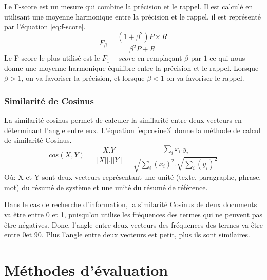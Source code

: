 \documentclass[a4paper,12pt,oneside]{../use/ESIthesis}
\begin{document}
Le F-score est un mesure qui combine la précision et le rappel. 
Il est calculé en utilisant une moyenne harmonique entre la précision et le rappel, il est représenté par l'équation \ref{eq:f-score}.
\begin{equation}
\label{eq:f-score}
F_{\beta} = \frac
{(1+\beta^2) P \times R}
{ \beta^2 P + R}
\end{equation}
Le F-score le plus utilisé est le $F_1-score$ en remplaçant $\beta$ par $1$ ce qui nous donne une moyenne harmonique équilibre entre la précision et le rappel.
Lorsque $\beta > 1$, on va favoriser la précision, et lorsque $\beta < 1$ on va favoriser le rappel.

\subsubsection{Similarité de Cosinus}

La similarité cosinus permet de calculer la similarité entre deux vecteurs en déterminant l'angle entre eux. 
L'équation \ref{eq:cosine3} donne la méthode de calcul de similarité Cosinus.
\begin{equation}
\label{eq:cosine3}
cos(X,Y) = 
\frac {X . Y}{||X|| . ||Y||} = 
\frac {\sum_i {x_i.y_i} }{\sqrt{\sum_i(x_i)^2} . \sqrt{\sum_i(y_i)^2}}
\end{equation}
Où: 
X et Y sont deux vecteurs représentant une unité (texte, paragraphe, phrase, mot) du résumé de système et une unité du résumé de référence.

Dans le cas de recherche d'information, la similarité Cosinus de deux documents va être entre 0 et 1, puisqu'on utilise les fréquences des termes qui ne peuvent pas être négatives. 
Donc, l'angle entre deux vecteurs des fréquences des termes va être entre 0\textdegree et 90\textdegree. 
Plus l'angle entre deux vecteurs est petit, plus ils sont similaires. 

%

\section{Méthodes d'évaluation}
\end{document}
